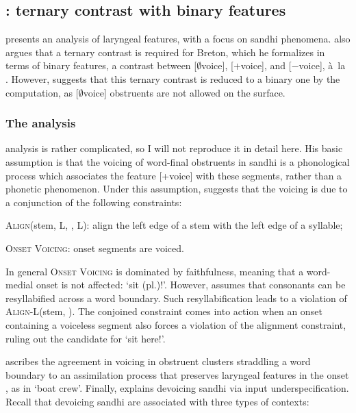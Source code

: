 \subsection{\citet{kramer-breton}: ternary contrast with binary features}
\label{sec:citetkr-bret-tern}

\citet{kramer-breton} presents an analysis of laryngeal features, with a focus on sandhi phenomena. \citeauthor{kramer-breton} also argues that a ternary contrast is required for Breton, which he formalizes in terms of binary features, \ie a contrast between [$\emptyset$voice], [$+$voice], and [$-$voice], à~la \citet{inkelas94}. However, \citet{kramer-breton} suggests that this ternary contrast is reduced to a binary one by the computation, as [$\emptyset$voice] obstruents are not allowed on the surface.

\subsubsection{The analysis}
\label{sec:analysis-12}

 analysis is rather complicated, so I will not reproduce it in detail here. His basic assumption is that the voicing of word\hyp final obstruents in sandhi is a phonological process which associates the feature [+voice] with these segments, rather than a phonetic phenomenon. Under this assumption, \citet{kramer-breton} suggests that the voicing is due to a conjunction of the following constraints:

\begin{itemize*}
\item \textsc{Align}(stem, L, \sy, L): align the left edge of a stem with the left edge of a syllable;
\item \textsc{Onset Voicing}: onset segments are voiced.
\end{itemize*}

In general \textsc{Onset Voicing} is dominated by faithfulness, meaning that a word\hyp medial onset is not affected:  `sit (pl.)!'. However, \citet{kramer-breton} assumes that consonants can be resyllabified across a word boundary. Such resyllabification leads to a violation of \textsc{Align-L}(stem, \sy). The conjoined constraint comes into action when an onset containing a voiceless segment also forces a violation of the alignment constraint, ruling out the candidate  for `sit here!'.

\citet{kramer-breton} ascribes the agreement in voicing in obstruent clusters straddling a word boundary to an assimilation process that preserves laryngeal features in the onset \citep{beckman}, as in  `boat crew'. Finally, \citet{kramer-breton} explains devoicing sandhi via input underspecification. Recall that devoicing sandhi are associated with three types of contexts:

